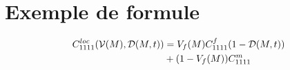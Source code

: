 \section{Exemple de formule} \label{section_chapter_xxx_exemple_de_formule}


\begin{equation} \label{equation_chapter_xxx_lelabel}
\begin{split}
{C}^{loc}_{1111}({\cal{V}}(M),{\cal{D}}(M, t))& = V_{f}(M) C_{1111}^{f} (   1 - {\cal{D}}(M, t) )  \\
& + (1-V_{f}(M)) C_{1111}^{m}
\end{split}
\end{equation}





